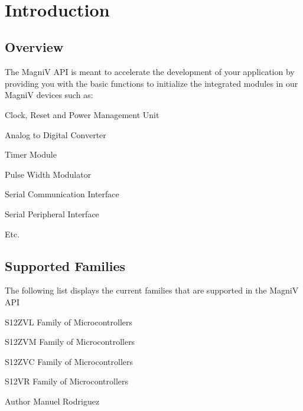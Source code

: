 ~\newline
 \section*{Introduction}


\begin{DoxyItemize}
\item \subsection*{Overview}



The Magni\+V A\+P\+I is meant to accelerate the development of your application by providing you with the basic functions to initialize the integrated modules in our Magni\+V devices such as\+: 
\begin{DoxyItemize}
\item Clock, Reset and Power Management Unit 
\item Analog to Digital Converter 
\item Timer Module 
\item Pulse Width Modulator 
\item Serial Communication Interface 
\item Serial Peripheral Interface 
\item Etc. 
\end{DoxyItemize}



 
\item \subsection*{Supported Families}



The following list displays the current families that are supported in the Magni\+V A\+P\+I 
\begin{DoxyItemize}
\item S12\+Z\+V\+L Family of Microcontrollers 
\item S12\+Z\+V\+M Family of Microcontrollers 
\item S12\+Z\+V\+C Family of Microcontrollers 
\item S12\+V\+R Family of Microcontrollers 
\end{DoxyItemize}


\end{DoxyItemize}

\begin{DoxyAuthor}{Author}
Manuel Rodriguez 
\end{DoxyAuthor}
